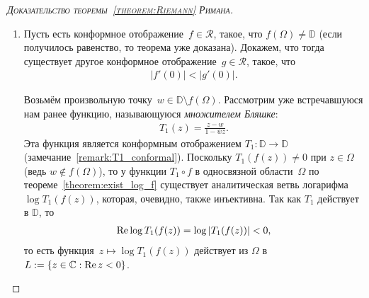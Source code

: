 \documentclass[../complex-analysis.tex]{subfiles}
\begin{document}
\begin{proof}[\normalfont\textsc{Доказательство теоремы~\ref{theorem:Riemann} Римана}]
\begin{enumerate}
   Благодаря тому, что функции~$f_n$ аналитичны и равномерно ограничены, по теореме \ref{theorem:montel} Монтеля существует подпоследовательность $ \{f_{i_n}\}_{n=1}^{\infty}$, сходящаяся к функции~$f$ равномерно на компактах в $ \Omega $, причём по замечанию~\ref{remark:Montel Theorem Analytic Limit} функция~$ f $ аналитична в $ \Omega $, и по понятным причинам $ f(0) = 0 $. По теореме~\ref{theorem:analytic_injective} (следствие из теоремы Гурвица) функция~$ f $ либо постоянна, либо инъективна. Если $ f $ постоянна, то $ f \equiv 0 $ на $ \Omega $ (так как $ f(0) = 0 $). В противном случае функция~$ f $ инъективна. При этом функция~$ f $ действует в $ \mathbb D $: по предельному переходу в неравенстве она уж точно действует в $ \overline{\mathbb D} $, а так как по теореме~\ref{theorem:analytic_implies_open} образ $ f(\Omega) $ --- открытое подмножество~$ \CC $, то $ f(\Omega) \subset \mathop{\mathrm{Int}} \overline{\mathbb D} = \mathbb D $. Так или иначе, $ f \in \mathcal R $, и семейство~$ \mathcal R $ компактно.

  \item \label{enum3:proof:Riemann Thm} Пусть есть конформное отображение~$ f \in \mathcal R $, такое, что $ f(\Omega) \neq \mathbb D $ (если получилось равенство, то теорема уже доказана). Докажем, что тогда существует другое конформное отображение~$ g \in \mathcal R $, такое, что
   \begin{align}
    \label{eq:Larger Derivative at Zero:proof:Riemann Thm}
    \left| f'(0) \right| < \left| g'(0) \right|.
   \end{align}

   Возьмём произвольную точку~$ w \in \mathbb D \setminus f(\Omega) $. Рассмотрим уже встречавшуюся нам ранее функцию, называющуюся \emph{множителем Бляшке}:
   \begin{align*}
    T_1(z) = \frac{z-w}{1 - \overline w z}.
   \end{align*} Эта функция является конформным отображением $ T_1\colon\mathbb D \to \mathbb D $ (замечание~\ref{remark:T1_conformal}). Поскольку $ T_1(f(z)) \neq 0 $ при $ z \in \Omega $ (ведь $ w \notin f(\Omega) $), то у функции $ T_1 \circ f $ в односвязной области~$ \Omega $ по теореме~\ref{theorem:exist_log_f} существует аналитическая ветвь логарифма $\log T_1(f(z))$, которая, очевидно, также инъективна. Так как $ T_1 $ действует в $ \mathbb D $, то
   \begin{align*}
    \operatorname{Re} \log T_1(f(z)) = \log \left| T_1(f(z)) \right| < 0,
   \end{align*} то есть функция~$ z \mapsto \log T_1(f(z)) $ действует из $ \Omega $ в $ L := \left\{ z \in \mathbb{C} : \operatorname{Re} z < 0 \right\} $.


\end{enumerate}
\end{proof}
\end{document}
